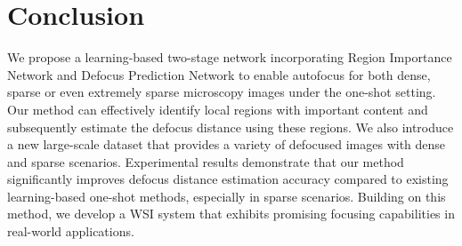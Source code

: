 \section{Conclusion}
\label{sec:conclusion}

We propose a learning-based two-stage network incorporating Region Importance Network and Defocus Prediction Network to enable autofocus for both dense, sparse or even extremely sparse microscopy images under the one-shot setting.
Our method can effectively identify local regions with important content and subsequently estimate the defocus distance using these regions.
We also introduce a new large-scale dataset that provides a variety of defocused images with dense and sparse scenarios.
Experimental results demonstrate that our method significantly improves defocus distance estimation accuracy compared to existing learning-based one-shot methods, especially in sparse scenarios.
Building on this method, we develop a WSI system that exhibits promising focusing capabilities in real-world applications.


